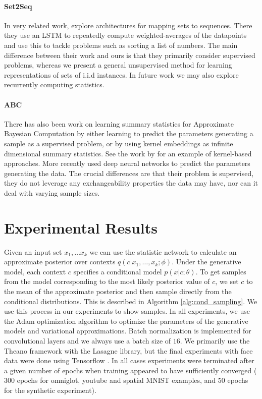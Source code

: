 \documentclass{article} \usepackage{iclr2017_conference,times}
\newcommand{\iid}{i.i.d }
\begin{document}
\paragraph{Set2Seq} In very related work, \citet{set2seq} explore architectures for mapping sets to sequences. There they use an LSTM to repeatedly compute weighted-averages of the datapoints and use this to tackle problems such as sorting a list of numbers. The main difference between their work and ours is that they primarily consider supervised problems, whereas we present a general unsupervised method for learning representations of sets of \iid instances. In future work we may also explore recurrently computing statistics.

\paragraph{ABC}
There has also been work on learning summary statistics for Approximate Bayesian Computation by either learning to predict the parameters generating a sample as a supervised problem, or by using kernel embeddings as infinite dimensional summary statistics. See the work by \citet{kernel_bayes} for an example of kernel-based approaches. More recently \citet{deep_summary_statistics} used deep neural networks to predict the parameters generating the data. The crucial differences are that their problem is supervised, they do not leverage any exchangeability properties the data may have, nor can it deal with varying sample sizes.
\vspace{-0.5em}
\section{Experimental Results}
Given an input set $x_1, \dots x_k$ we can use the statistic network to calculate an approximate posterior over contexts $q(c|x_1, \dots, x_k; \phi)$. Under the generative model, each context $c$ specifies a conditional model $p(x | c ;\theta)$. To get samples from the model corresponding to the most likely posterior value of $c$, we set $c$ to the mean of the approximate posterior and then sample directly from the conditional distributions. This is described in Algorithm \ref{alg:cond_sampling}. We use this process in our experiments to show samples. In all experiments, we use the Adam optimization algorithm \citep{adam} to optimize the parameters of the generative models and variational approximations. Batch normalization \citep{batchnorm} is implemented for convolutional layers and we always use a batch size of $16$. We primarily use the Theano \citep{theano} framework with the Lasagne \citep{lasagne} library, but the final experiments with face data were done using Tensorflow \citep{tensorflow}. In all cases experiments were terminated after a given number of epochs when training appeared to have sufficiently converged ($300$ epochs for omniglot, youtube and spatial MNIST examples, and $50$ epochs for the synthetic experiment).
\end{document}
